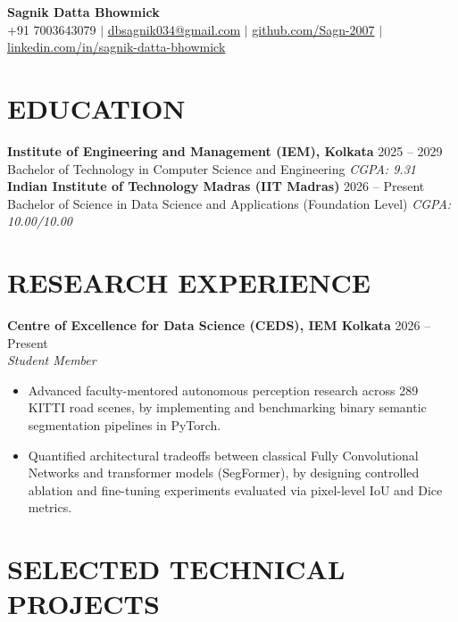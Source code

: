 \documentclass[10pt, a4paper]{article}
\begin{document}
\pagestyle{empty}

\begin{center}
    {\Large \textbf{Sagnik Datta Bhowmick}} \\ \vspace{1pt}
    +91 7003643079 $|$ \href{mailto:dbsagnik034@gmail.com}{dbsagnik034@gmail.com} $|$ \href{https://github.com/Sagn-2007}{github.com/Sagn-2007} $|$ \href{https://www.linkedin.com/in/sagnik-datta-bhowmick}{linkedin.com/in/sagnik-datta-bhowmick}
\end{center}

\vspace{-12pt}

\section{EDUCATION}
\textbf{Institute of Engineering and Management (IEM), Kolkata} \hfill 2025 -- 2029 \\
Bachelor of Technology in Computer Science and Engineering \hfill \textit{CGPA: 9.31} \\[2pt]
\textbf{Indian Institute of Technology Madras (IIT Madras)} \hfill 2026 -- Present \\
Bachelor of Science in Data Science and Applications (Foundation Level) \hfill \textit{CGPA: 10.00/10.00}

\section{RESEARCH EXPERIENCE}
\textbf{Centre of Excellence for Data Science (CEDS), IEM Kolkata} \hfill 2026 -- Present \\
\textit{Student Member}
\begin{itemize}[leftmargin=*, noitemsep, topsep=1pt, parsep=0pt]
    \item Advanced faculty-mentored autonomous perception research across 289 KITTI road scenes, by implementing and benchmarking binary semantic segmentation pipelines in PyTorch.
    \item Quantified architectural tradeoffs between classical Fully Convolutional Networks and transformer models (SegFormer), by designing controlled ablation and fine-tuning experiments evaluated via pixel-level IoU and Dice metrics.
\end{itemize}

\section{SELECTED TECHNICAL PROJECTS}
\end{document}
